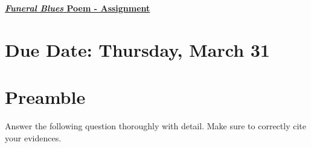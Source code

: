 \documentclass[12pt]{article} %
\begin{document}
	\renewcommand*{\coursecode}{MATH 235} %
	\renewcommand*{\assgnnumber}{Assignment 1} %
	\renewcommand*{\submdate}{September 14, 2021} %
	\renewcommand*{\studentfname}{Abdullah} %
	\renewcommand*{\studentlname}{Zubair} %
    \renewcommand*{\proofname}{Proof:}

	\renewcommand\qedsymbol{$\blacksquare$}
	\setfigpath
	\fancyhfoffset[L,O]{0pt} %




\begin{center}
	\textbf{\underline{\Huge{\textit{Funeral Blues} Poem - Assignment}}}
\end{center}

\section*{Due Date: Thursday, March 31}

\section*{Preamble}

Answer the following question thoroughly with detail. Make sure to correctly cite your evidences.
\end{document}
